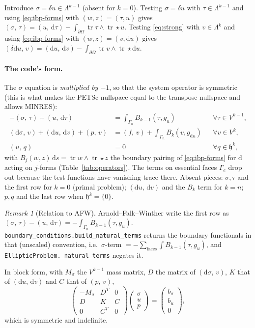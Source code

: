 \documentclass[11pt]{article}
\newcommand{\dd}{\mathrm{d}}
\newcommand{\cod}{\delta}
\newcommand{\tr}{\operatorname{tr}}
\newcommand{\hodge}{\star}
\newcommand{\Hspace}{\mathfrak{h}}
\newcommand{\code}[1]{\texttt{#1}}
\newcommand{\ip}[2]{\left(#1,\,#2\right)}
\theoremstyle{remark}
\newtheorem{remark}{Remark}
\begin{document}
Introduce $\sigma=\cod u\in\Lambda^{k-1}$ (absent for $k=0$). Testing $\sigma=\cod u$ with
$\tau\in\Lambda^{k-1}$ and using \eqref{eq:ibp-forms} with $(w,z)=(\tau,u)$ gives
$\ip{\sigma}{\tau} = \ip{u}{\dd\tau} - \int_{\partial\Omega}\tr\tau\wedge\tr\hodge u$. Testing
\eqref{eq:strong} with $v\in\Lambda^k$ and using \eqref{eq:ibp-forms} with $(w,z)=(v,\dd u)$
gives $\ip{\cod\dd u}{v} = \ip{\dd u}{\dd v} - \int_{\partial\Omega}\tr v\wedge\tr\hodge\dd u$.

\paragraph{The code's form.} The $\sigma$ equation is \emph{multiplied by $-1$}, so that the
system operator is symmetric (this is what makes the PETSc nullspace equal to the transpose
nullspace and allows MINRES):
\begin{equation}\label{eq:mixed}
\boxed{
\begin{aligned}
  -\ip{\sigma}{\tau} + \ip{u}{\dd\tau} &= \textstyle\int_{\Gamma_n} B_{k-1}(\tau, g_u)
     && \forall\tau\in V^{k-1},\\
  \ip{\dd\sigma}{v} + \ip{\dd u}{\dd v} + \ip{p}{v} &= \ip{f}{v} + \textstyle\int_{\Gamma_n} B_k(v, g_{\dd u})
     && \forall v\in V^{k},\\
  \ip{u}{q} &= 0 && \forall q\in\Hspace^k,
\end{aligned}}
\end{equation}
with $B_j(w,z)\,\dd s = \tr w\wedge\tr\hodge z$ the boundary pairing of \eqref{eq:ibp-forms} for
$\dd$ acting on $j$-forms (Table~\ref{tab:operators}). The terms on essential faces $\Gamma_e$
drop out because the test functions have vanishing trace there. Absent pieces:
$\sigma,\tau$ and the first row for $k=0$ (primal problem); $\ip{\dd u}{\dd v}$ and the
$B_k$ term for $k=n$; $p,q$ and the last row when $\Hspace^k=\{0\}$.

\begin{remark}[Relation to AFW]
Arnold--Falk--Winther write the first row as $\ip{\sigma}{\tau}-\ip{u}{\dd\tau}=-\int_{\Gamma_n}
B_{k-1}(\tau,g_u)$. \code{boundary\_conditions.build\_natural\_terms} returns the boundary
functionals in that (unscaled) convention, i.e.\ $\sigma$-term $=-\sum_{\text{faces}}\int
B_{k-1}(\tau,g_u)$, and \code{EllipticProblem.\_natural\_terms} negates it.
\end{remark}

In block form, with $M_\sigma$ the $V^{k-1}$ mass matrix, $D$ the matrix of
$\ip{\dd\sigma}{v}$, $K$ that of $\ip{\dd u}{\dd v}$ and $C$ that of $\ip{p}{v}$,
\[
  \begin{pmatrix} -M_\sigma & D^T & 0\\ D & K & C\\ 0 & C^T & 0 \end{pmatrix}
  \begin{pmatrix}\sigma\\ u\\ p\end{pmatrix} =
  \begin{pmatrix} b_\sigma\\ b_u\\ 0\end{pmatrix},
\]
which is symmetric and indefinite.
\end{document}
